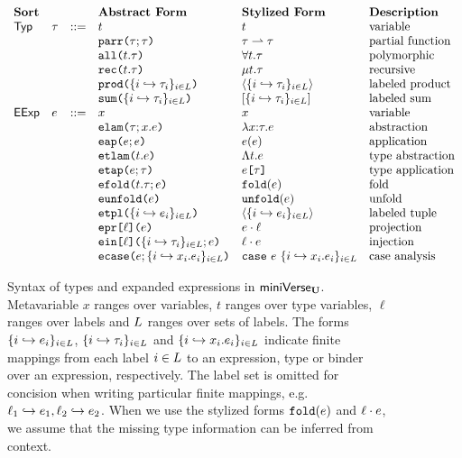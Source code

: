 \begin{figure}
$\begin{array}{lllllll}
\textbf{Sort} & & & \textbf{Abstract Form} & \textbf{Stylized Form} & \textbf{Description}\\
\mathsf{Typ} & \tau & ::= & t & t & \text{variable}\\
&&& \texttt{parr}\texttt{(}\tau; \tau\texttt{)} & \tau \rightharpoonup \tau & \text{partial function}\\
&&& \texttt{all}\texttt{(}t.\tau\texttt{)} & \forall t.\tau & \text{polymorphic}\\
&&& \texttt{rec}\texttt{(}t.\tau\texttt{)} & \mu t.\tau & \text{recursive}\\
&&& \texttt{prod}\texttt{(}\{i \hookrightarrow \tau_{i}\}_{i \in L}\texttt{)} & \langle \{i \hookrightarrow \tau_{i}\}_{i \in L} \rangle & \text{labeled product}\\
&&& \texttt{sum}\texttt{(}\{i \hookrightarrow \tau_{i}\}_{i \in L}\texttt{)} & [\{i \hookrightarrow \tau_{i}\}_{i \in L}] & \text{labeled sum}\\
\mathsf{EExp} & e & ::= & x & x & \text{variable}\\
&&& \texttt{elam}\texttt{(}\tau; x.e\texttt{)} & \lambda x{:}\tau.e & \text{abstraction}\\
&&& \texttt{eap}\texttt{(}e; e\texttt{)} & e(e) & \text{application}\\
&&& \texttt{etlam}\texttt{(}t.e\texttt{)} & \Lambda t.e & \text{type abstraction}\\
&&& \texttt{etap}\texttt{(}e; \tau\texttt{)} & e\texttt{[}\tau\texttt{]} & \text{type application}\\
&&& \texttt{efold}\texttt{(}t.\tau; e\texttt{)} & \texttt{fold}(e) & \text{fold}\\
&&& \texttt{eunfold}\texttt{(}e\texttt{)} & \texttt{unfold}(e) & \text{unfold}\\
&&& \texttt{etpl}\texttt{(}\{i \hookrightarrow e_{i}\}_{i \in L}\texttt{)} & \langle \{i \hookrightarrow e_{i}\}_{i \in L}\rangle & \text{labeled tuple}\\
&&& \texttt{epr}\texttt{[}\ell\texttt{](}e\texttt{)} & e \cdot \ell & \text{projection}\\
&&& \texttt{ein}\texttt{[}\ell\texttt{](}\{i \hookrightarrow \tau_{i}\}_{i \in L}; e\texttt{)} & \ell \cdot e & \text{injection}\\
&&& \texttt{ecase}\texttt{(}e; \{i \hookrightarrow x_{i}.e_{i}\}_{i \in L}\texttt{)} & \texttt{case}~e~\{i \hookrightarrow x_{i}.e_{i}\}_{i \in L} & \text{case analysis}
\end{array}$
\caption[Syntax of types and expanded expressions in $\miniVerseU$.]{Syntax of types and expanded expressions in $\miniVerseU$. Metavariable $x$ ranges over variables, $t$ ranges over type variables, $\ell$ ranges over labels and $L$ ranges over sets of labels. The forms $\{i \hookrightarrow e_{i}\}_{i \in L}$, $\{i \hookrightarrow \tau_{i}\}_{i \in L}$ and $\{i \hookrightarrow x_{i}.e_{i}\}_{i \in L}$ indicate finite mappings from each label $i \in L$ to an expression, type or binder over an expression, respectively. The label set is omitted for concision when writing particular finite mappings, e.g. $\ell_1 \hookrightarrow e_1, \ell_2 \hookrightarrow e_2$. When we use the stylized forms $\texttt{fold}(e)$ and $\ell \cdot e$, we assume that the missing type information can be inferred from context.}
\label{fig:U-expanded-terms}
\end{figure}

